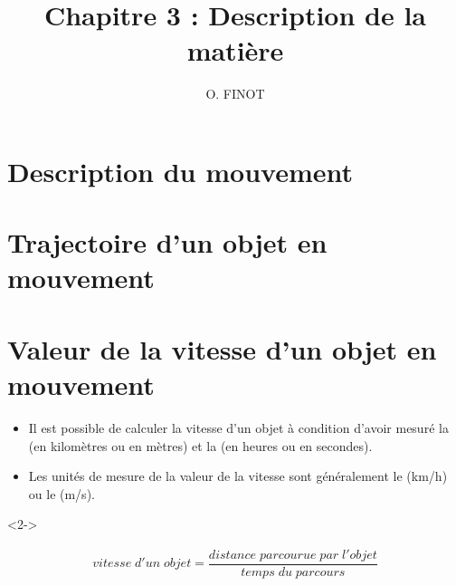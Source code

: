 \documentclass[xcolor={dvipsnames}]{beamer}
\title{Chapitre 3 : Description de la matière}
\author{O. FINOT}\institute{Collège S$^t$ Bernard}
\begin{document}
\begin{frame}
  \titlepage 
\end{frame}


\section{Description du mouvement}

\section{Trajectoire d'un objet en mouvement }


\section{Valeur de la vitesse d'un objet en mouvement}

\begin{frame}




\begin{alertblock}{}
	\begin{itemize}
		\item Il est possible de calculer la vitesse d'un objet à condition d'avoir mesuré la  (en kilomètres ou en mètres) et la  (en heures ou en secondes). 
		
		\item Les unités de mesure de la valeur de la vitesse sont généralement le  (km/h) ou le  (m/s).
	\end{itemize}
	
	
	
\end{alertblock}

\begin{alertblock}<2->{}
	
	\begin{align*}
		vitesse\; d'un\; objet = \dfrac{distance \;  parcourue \; par \; l'objet}{temps \; du  \; parcours}
	\end{align*}
\end{alertblock}

\end{frame}
\end{document}
